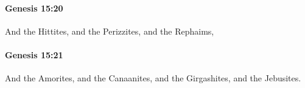 		\paragraph{Genesis 15:20} %
			\label{GENESIS-15-20}

			And the Hittites, and the Perizzites, and the Rephaims,


		\paragraph{Genesis 15:21} %
			\label{GENESIS-15-21}

			And the Amorites, and the Canaanites, and the Girgashites, and the Jebusites.

